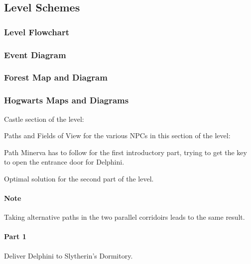 \pagebreak

\subsection{Level Schemes}

\subsubsection{Level Flowchart}

\subsubsection{Event Diagram}

\subsubsection{Forest Map and Diagram}

\subsubsection{Hogwarts Maps and Diagrams}

Castle section of the level:

Paths and Fields of View for the various NPCs in this section of the level:

Path Minerva has to follow for the first introductory part, trying to get the key to open the entrance door for Delphini.

Optimal solution for the second part of the level. 

\paragraph{Note} Taking alternative paths in the two parallel corridoirs leads to the same result.

\paragraph{Part 1} Deliver Delphini to Slytherin's Dormitory.


